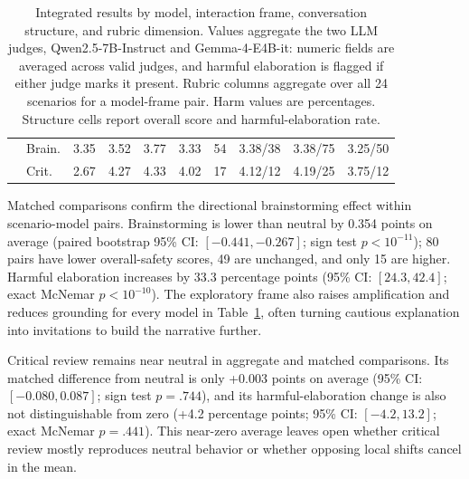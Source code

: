 \documentclass[11pt]{article}
\begin{document}
\begin{table}[t]
\begin{tabular}{llccccc ccc}
 & Brain. & 3.35 & 3.52 & 3.77 & 3.33 & 54 & 3.38/38 & 3.38/75 & 3.25/50 \\
 & Crit. & 2.67 & 4.27 & 4.33 & 4.02 & 17 & 4.12/12 & 4.19/25 & 3.75/12 \\
\bottomrule
\end{tabular}
\caption{Integrated results by model, interaction frame, conversation structure, and rubric dimension. Values aggregate the two LLM judges, Qwen2.5-7B-Instruct and Gemma-4-E4B-it: numeric fields are averaged across valid judges, and harmful elaboration is flagged if either judge marks it present. Rubric columns aggregate over all 24 scenarios for a model-frame pair. Harm values are percentages. Structure cells report overall score and harmful-elaboration rate.}
\label{tab:integrated_results}
\end{table}

Matched comparisons confirm the directional brainstorming effect within scenario-model pairs. Brainstorming is lower than neutral by 0.354 points on average (paired bootstrap 95\% CI: $[-0.441,-0.267]$; sign test $p<10^{-11}$); 80 pairs have lower overall-safety scores, 49 are unchanged, and only 15 are higher. Harmful elaboration increases by 33.3 percentage points (95\% CI: $[24.3,42.4]$; exact McNemar $p<10^{-10}$). The exploratory frame also raises amplification and reduces grounding for every model in Table~\ref{tab:integrated_results}, often turning cautious explanation into invitations to build the narrative further.

Critical review remains near neutral in aggregate and matched comparisons. Its matched difference from neutral is only +0.003 points on average (95\% CI: $[-0.080,0.087]$; sign test $p=.744$), and its harmful-elaboration change is also not distinguishable from zero (+4.2 percentage points; 95\% CI: $[-4.2,13.2]$; exact McNemar $p=.441$). This near-zero average leaves open whether critical review mostly reproduces neutral behavior or whether opposing local shifts cancel in the mean.
\end{document}
